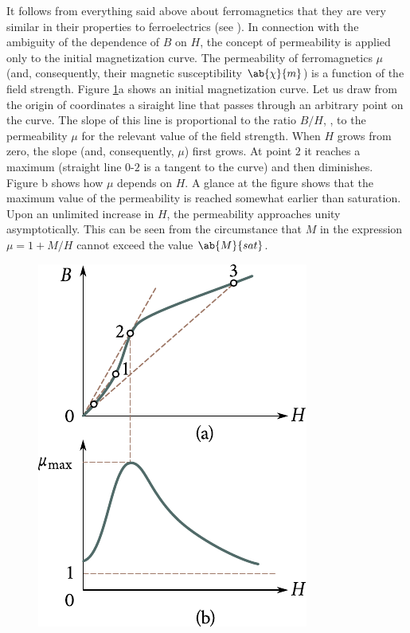 It follows from everything said above about ferromagnetics that they are very similar in their properties to ferroelectrics (see ).
In connection with the ambiguity of the dependence of $B$ on $H$, the concept of permeability is applied only to the initial magnetization curve.
The permeability of ferromagnetics $\mu$ (and, consequently, their magnetic susceptibility $\ab{\chi}{m}$) is a function of the field strength.
Figure \ref{fig:7_19}a shows an initial magnetization curve.
Let us draw from the origin of coordinates a siraight line that passes through an arbitrary point on the curve.
The slope of this line is proportional to the ratio $B/H$, \ie, to the permeability $\mu$ for the relevant value of the field strength.
When $H$ grows from zero, the slope (and, consequently, $\mu$) first grows. At point $2$ it reaches a maximum (straight line $0$-$2$ is a tangent to the curve) and then diminishes.
Figure b shows how $\mu$ depends on $H$.
A glance at the figure shows that the maximum value of the permeability is reached somewhat earlier than saturation.
Upon an unlimited increase in $H$, the permeability
approaches unity asymptotically.
This can be seen from the circumstance that $M$ in the expression $\mu=1+M/H$ cannot exceed the value $\ab{M}{sat}$.

\begin{figure}[!htb]
	\begin{center}
		\includegraphics[scale=1]{figures/ch_07/fig_7_19.pdf}
		\caption[]{}
		\label{fig:7_19}
	\end{center}
	\vspace{-0.8cm}
\end{figure}


